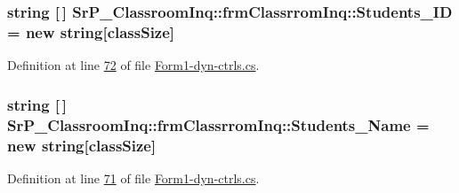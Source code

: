 \hypertarget{class_sr_p___classroom_inq_1_1frm_classrrom_inq_a68a93f6247168ebfa500f7afe83cce94}{
\subsubsection[{\-Students\-\_\-\-I\-D}]{\setlength{\rightskip}{0pt plus 5cm}string \mbox{[}$\,$\mbox{]} {\bf \-Sr\-P\-\_\-\-Classroom\-Inq\-::frm\-Classrrom\-Inq\-::\-Students\-\_\-\-I\-D} = new string\mbox{[}{\bf class\-Size}\mbox{]}}}
\label{class_sr_p___classroom_inq_1_1frm_classrrom_inq_a68a93f6247168ebfa500f7afe83cce94}


\-Definition at line \hyperlink{_form1-dyn-ctrls_8cs_source_l00072}{72} of file \hyperlink{_form1-dyn-ctrls_8cs_source}{\-Form1-\/dyn-\/ctrls.\-cs}.

\hypertarget{class_sr_p___classroom_inq_1_1frm_classrrom_inq_ad595ee0cb55235eda789723fe8967521}{
\subsubsection[{\-Students\-\_\-\-Name}]{\setlength{\rightskip}{0pt plus 5cm}string \mbox{[}$\,$\mbox{]} {\bf \-Sr\-P\-\_\-\-Classroom\-Inq\-::frm\-Classrrom\-Inq\-::\-Students\-\_\-\-Name} = new string\mbox{[}{\bf class\-Size}\mbox{]}}}
\label{class_sr_p___classroom_inq_1_1frm_classrrom_inq_ad595ee0cb55235eda789723fe8967521}


\-Definition at line \hyperlink{_form1-dyn-ctrls_8cs_source_l00071}{71} of file \hyperlink{_form1-dyn-ctrls_8cs_source}{\-Form1-\/dyn-\/ctrls.\-cs}.

